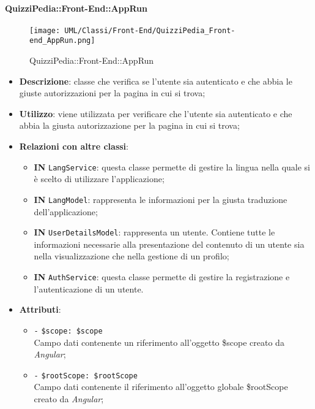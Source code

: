 	\paragraph{QuizziPedia::Front-End::AppRun}
		
		\label{QuizziPedia::Front-End::AppRun}
		
		\begin{figure}[ht]
			\centering
			\texttt{[image: UML/Classi/Front-End/QuizziPedia\_Front-end\_AppRun.png]}
			\caption{QuizziPedia::Front-End::AppRun}
		\end{figure} \FloatBarrier
		
		\begin{itemize}
			\item \textbf{Descrizione}: classe che verifica se l'utente sia autenticato e che abbia le giuste autorizzazioni per la pagina in cui si trova;
			\item \textbf{Utilizzo}: viene utilizzata per verificare che l’utente sia autenticato e che abbia la giusta autorizzazione per la pagina in cui si trova;
			\item \textbf{Relazioni con altre classi}: 
			\begin{itemize}
				\item \textbf{IN} \texttt{LangService}: questa classe permette di gestire la lingua nella quale si è scelto di utilizzare l'applicazione;
				\item \textbf{IN} \texttt{LangModel}: rappresenta le informazioni per la giusta traduzione dell'applicazione;
				\item \textbf{IN} \texttt{UserDetailsModel}: rappresenta un utente. Contiene tutte le informazioni necessarie alla presentazione del contenuto di un utente sia nella visualizzazione che nella gestione di un profilo;
				\item \textbf{IN} \texttt{AuthService}: questa classe permette di gestire la registrazione e l'autenticazione di un utente.
			\end{itemize}
			\item \textbf{Attributi}: 
			\begin{itemize}
				\item \texttt{-} \texttt{\$scope: \$scope} \\
				Campo dati contenente un riferimento all'oggetto \$scope creato da \textit{Angular};
				\item \texttt{-} \texttt{\$rootScope: \$rootScope} \\
				Campo dati contenente il riferimento all'oggetto globale \$rootScope creato da \textit{Angular};

\end{itemize}
\end{itemize}
